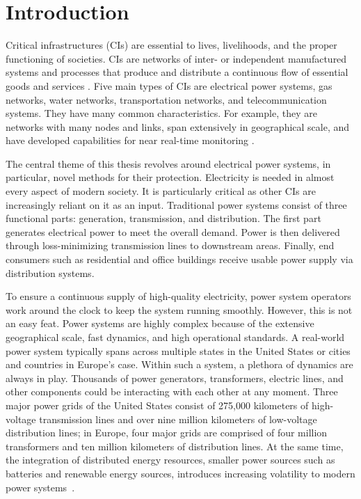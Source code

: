 
\chapter{Introduction}
\label{ch:introduction}
\vspace{2em}


Critical infrastructures (CIs) are essential to lives, livelihoods, and the proper functioning of societies. CIs are networks of inter- or independent manufactured systems and processes that produce and distribute a continuous flow of essential goods and services \cite{ellis1997report}. Five main types of CIs are electrical power systems, gas networks, water networks, transportation networks, and telecommunication systems. They have many common characteristics. For example, they are networks with many nodes and links, span extensively in geographical scale, and have developed capabilities for near real-time monitoring \cite{guikema2009natural}.

The central theme of this thesis revolves around electrical power systems, in particular, novel methods for their protection. Electricity is needed in almost every aspect of modern society. It is particularly critical as other CIs are increasingly reliant on it as an input. Traditional power systems consist of three functional parts: generation, transmission, and distribution. The first part generates electrical power to meet the overall demand. Power is then delivered through loss-minimizing transmission lines to downstream areas. Finally, end consumers such as residential and office buildings receive usable power supply via distribution systems.

To ensure a continuous supply of high-quality electricity, power system operators work around the clock to keep the system running smoothly. However, this is not an easy feat. Power systems are highly complex because of the extensive geographical scale, fast dynamics, and high operational standards. A real-world power system typically spans across multiple states in the United States or cities and countries in Europe’s case. Within such a system, a plethora of dynamics are always in play. Thousands of power generators, transformers, electric lines, and other components could be interacting with each other at any moment. Three major power grids of the United States consist of 275,000 kilometers of high-voltage transmission lines and over nine million kilometers of low-voltage distribution lines; in Europe, four major grids are comprised of four million transformers and ten million kilometers of distribution lines. At the same time, the integration of distributed energy resources, smaller power sources such as batteries and renewable energy sources, introduces increasing volatility to modern power systems~\cite{amin2008challenges}.

